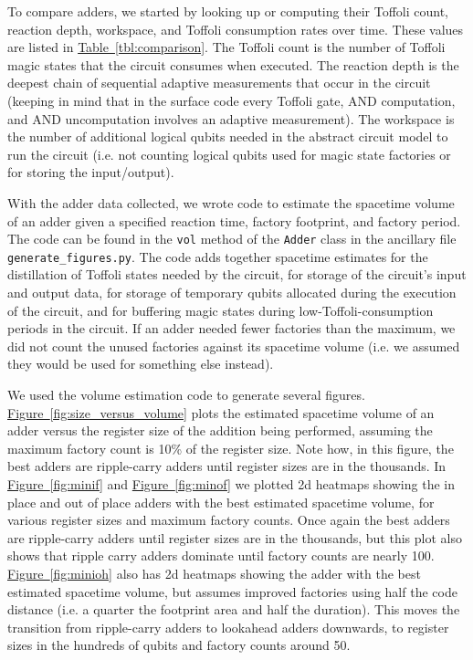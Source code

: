 \documentclass[onecolumn,unpublished]{quantumarticle}
\theoremstyle{definition}
\theoremstyle{definition}
\theoremstyle{definition}
\newcommand{\fig}[1]{\hyperref[fig:#1]{Figure~\ref*{fig:#1}}}
\newcommand{\tbl}[1]{\hyperref[tbl:#1]{Table~\ref*{tbl:#1}}}
\begin{document}
To compare adders, we started by looking up or computing their Toffoli count, reaction depth, workspace, and Toffoli consumption rates over time.
These values are listed in \tbl{comparison}.
The Toffoli count is the number of Toffoli magic states that the circuit consumes when executed.
The reaction depth is the deepest chain of sequential adaptive measurements that occur in the circuit (keeping in mind that in the surface code every Toffoli gate, AND computation, and AND uncomputation involves an adaptive measurement).
The workspace is the number of additional logical qubits needed in the abstract circuit model to run the circuit (i.e. not counting logical qubits used for magic state factories or for storing the input/output).

With the adder data collected, we wrote code to estimate the spacetime volume of an adder given a specified reaction time, factory footprint, and factory period.
The code can be found in the \texttt{vol} method of the \texttt{Adder} class in the ancillary file \texttt{generate\_figures.py}.
The code adds together spacetime estimates for the distillation of Toffoli states needed by the circuit, for storage of the circuit's input and output data, for storage of temporary qubits allocated during the execution of the circuit, and for buffering magic states during low-Toffoli-consumption periods in the circuit.
If an adder needed fewer factories than the maximum, we did not count the unused factories against its spacetime volume (i.e. we assumed they would be used for something else instead).

We used the volume estimation code to generate several figures.
\fig{size_versus_volume} plots the estimated spacetime volume of an adder versus the register size of the addition being performed, assuming the maximum factory count is 10\% of the register size.
Note how, in this figure, the best adders are ripple-carry adders until register sizes are in the thousands.
In \fig{minif} and \fig{minof} we plotted 2d heatmaps showing the in place and out of place adders with the best estimated spacetime volume, for various register sizes and maximum factory counts.
Once again the best adders are ripple-carry adders until register sizes are in the thousands, but this plot also shows that ripple carry adders dominate until factory counts are nearly 100.
\fig{minioh} also has 2d heatmaps showing the adder with the best estimated spacetime volume, but assumes improved factories using half the code distance (i.e. a quarter the footprint area and half the duration).
This moves the transition from ripple-carry adders to lookahead adders downwards, to register sizes in the hundreds of qubits and factory counts around 50.
\end{document}
